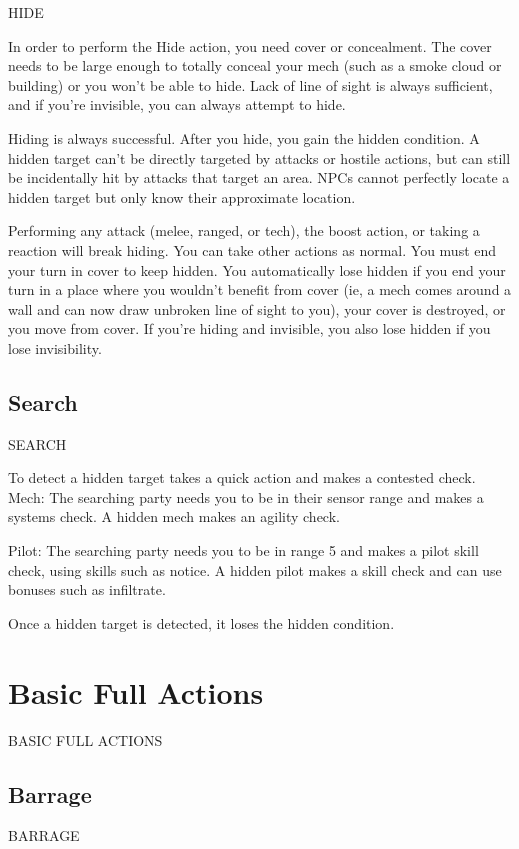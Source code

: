                                                      HIDE

In order to perform the Hide action, you need cover or concealment. The cover needs to be large
enough to totally conceal your mech (such as a smoke cloud or building) or you won’t be able to
hide. Lack of line of sight is always sufficient, and if you’re invisible, you can always attempt to
hide.


Hiding is always successful. After you hide, you gain the hidden condition. A hidden target can’t
be directly targeted by attacks or hostile actions, but can still be incidentally hit by attacks that
target an area. NPCs cannot perfectly locate a hidden target but only know their approximate
location.


Performing any attack (melee, ranged, or tech), the boost action, or taking a reaction will break
hiding. You can take other actions as normal. You must end your turn in cover to keep hidden.
You automatically lose hidden if you end your turn in a place where you wouldn’t benefit from
cover (ie, a mech comes around a wall and can now draw unbroken line of sight to you), your
cover is destroyed, or you move from cover. If you’re hiding and invisible, you also lose hidden if
you lose invisibility.

\subsection{Search}
                                                   SEARCH

To detect a hidden target takes a quick action and makes a contested check.
         Mech: The searching party needs you to be in their sensor range and makes a systems
         check. A hidden mech makes an agility check.

         Pilot: The searching party needs you to be in range 5 and makes a pilot skill check, using
         skills such as notice. A hidden pilot makes a skill check and can use bonuses such as
         infiltrate.

Once a hidden target is detected, it loses the hidden condition.

\section{Basic Full Actions}BASIC FULL ACTIONS
\subsection{Barrage}
                                               BARRAGE

